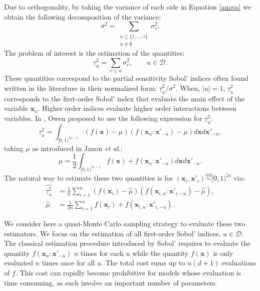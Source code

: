 \documentclass[]{elsarticle}
\theoremstyle{definition}
\newcommand{\bvec}[1]{\boldsymbol{#1}}
\newcommand{\vx}{\bvec{x}}
\begin{document}
Due to orthogonality, by taking the variance of each side in Equation \ref{anova} we obtain the following decomposition of the variance:
\[ \sigma^2 = \sum_{\substack{u \subseteq \{1,\dots,s\} \\ u \neq \emptyset}} \sigma_v^2.\]
The problem of interest is the estimation of the quantities:
\[\underline{\tau}_u^2 = \sum \limits_{v \subseteq u} \sigma_v^2, \qquad u \in \mathcal{D}.\]
These quantities correspond to the partial sensitivity Sobol' indices often found written in the literature in their normalized form: $\underline{\tau}_u^2/\sigma^2$. When, $|u|=1$, $\underline{\tau}_u^2$ corresponds to the first-order Sobol' index that evaluate the main effect of the variable $\vx_u$. Higher order indices evaluate higher order interactions between variables. In \cite{}, Owen proposed to use the following expression for $\underline{\tau}_u^2$:
\begin{equation}\label{first_order_indice}
\underline{\tau}_u^2  =\int_{[0,1)^{2s-1}}(f(\vx) - \mu) (f(\vx_u:{\vx'}_{-u})-\mu) d\vx d{\vx'}_{-u},
\end{equation}
taking $\mu$ as introduced in Janon \textit{et al.}:
\[\mu= \frac{1}{2} \int_{[0,1)^{2s-1}}f(\vx)+f(\vx_u:{\vx'}_{-u}) d\vx d{\vx'}_{-u}. \]
The natural way to estimate these two quantities is for $(\vx_i,\vx'_i) \stackrel{iid}{\sim} [0,1)^{2s}$ via:
\begin{align}
\widehat{\underline{\tau}_u^2} & = \frac{1}{n} \sum \limits_{i=1}^n (f(\vx_i) - \widehat{\mu}) (f(\vx_{i,u}:{\vx'}_{i,-u})-\widehat{\mu}),\label{first_order_indice_estimator}\\
\nonumber
\widehat{\mu} & = \frac{1}{2n} \sum \limits_{i=1}^n f(\vx_i) +f(\vx_{i,u}:{\vx'}_{i,-u}).
\end{align}

We consider here a quasi-Monte Carlo sampling strategy to evaluate these two estimators. We focus on the estimation of all first-order Sobol' indices, $u \in \mathcal{D}$. The classical estimation procedure introduced by Sobol' requires to evaluate the quantity $f(\vx_u:{\vx'}_{-u})$ $n$ times for each $u$ while the quantity $f(\vx)$ is only evaluated $n$ times once for all $u$. The total cost sums up to $n(d+1)$ evaluations of $f$. This cost can rapidly become prohibitive for models whose evaluation is time consuming, as such involve an important number of parameters. 
\end{document}
